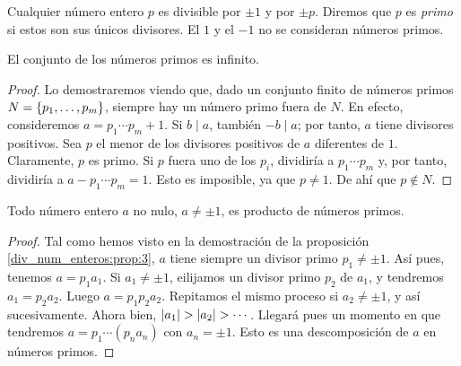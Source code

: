 Cualquier número entero $p$ es divisible por $\pm 1$ y por $\pm p$. Diremos que $p$ es {\it primo} si estos son sus únicos divisores. El $1$ y el $-1$ no se consideran números primos.

\begin{prop}\label{div_num_enteros:prop:3}
    El conjunto de los números primos es infinito.
\end{prop}

\begin{proof}
    Lo demostraremos viendo que, dado un conjunto finito de números primos $N=\left\lbrace p_1,\dots,p_m\right\rbrace$, siempre hay un número primo fuera de $N$. En efecto, consideremos $a=p_1\cdots p_m+1$. Si $b\mid a$, también $-b\mid a$; por tanto, $a$ tiene divisores positivos. Sea $p$ el menor de los divisores positivos de $a$ diferentes de $1$. Claramente, $p$ es primo. Si $p$ fuera uno de los $p_i$, dividiría a $p_1\cdots p_m$ y, por tanto, dividiría a $a-p_1\cdots p_m=1$. Esto es imposible, ya que $p\neq 1$. De ahí que $p\notin N$.
\end{proof}

\begin{prop}
    Todo número entero $a$ no nulo, $a\neq \pm 1$, es producto de números primos.
\end{prop}

\begin{proof}
    Tal como hemos visto en la demostración de la proposición \ref{div_num_enteros:prop:3}, $a$ tiene siempre un divisor primo $p_1\neq\pm 1$. Así pues, tenemos $a=p_1a_1$. Si $a_1\neq\pm 1$, eilijamos un divisor primo $p_2$ de $a_1$, y tendremos $a_1=p_2a_2$. Luego $a=p_1p_2a_2$. Repitamos el mismo proceso si $a_2\neq\pm 1$, y así sucesivamente. Ahora bien, $\abs{a_1}>\abs{a_2}>\cdots$. Llegará pues un momento en que tendremos $a=p_1\cdots (p_na_n)$ con $a_n=\pm 1$. Esto es una descomposición de $a$ en números primos.
\end{proof}